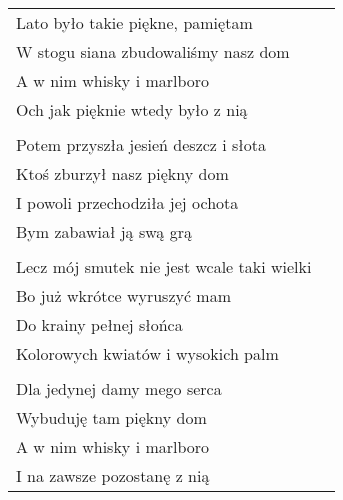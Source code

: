 \documentclass[a5paper]{article}
\begin{document}
\noindent
\begin{tabular}{@{}p{7.00cm}p{3cm}@{}}
Lato było takie piękne, pamiętam \\
W stogu siana zbudowaliśmy nasz dom \\
A w nim whisky i marlboro \\
Och jak pięknie wtedy było z nią \\ \\

Potem przyszła jesień deszcz i słota \\
Ktoś zburzył nasz piękny dom \\
I powoli przechodziła jej ochota \\
Bym zabawiał ją swą grą \\ \\

Lecz mój smutek nie jest wcale taki wielki \\
Bo już wkrótce wyruszyć mam \\
Do krainy pełnej słońca \\
Kolorowych kwiatów i wysokich palm \\ \\

Dla jedynej damy mego serca \\
Wybuduję tam piękny dom \\
A w nim whisky i marlboro \\
I na zawsze pozostanę z nią
\end{tabular}
\end{document}
